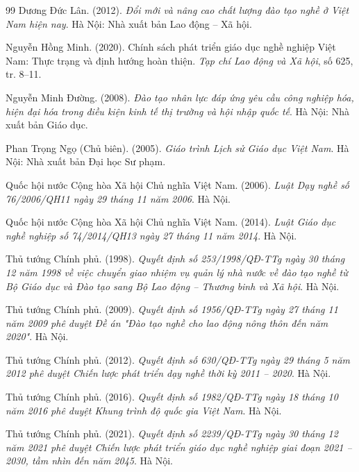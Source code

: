 \begin{thebibliography}{99}
Dương Đức Lân. (2012). \textit{Đổi mới và nâng cao chất lượng đào tạo nghề ở Việt Nam hiện nay}. Hà Nội: Nhà xuất bản Lao động -- Xã hội.

Nguyễn Hồng Minh. (2020). Chính sách phát triển giáo dục nghề nghiệp Việt Nam: Thực trạng và định hướng hoàn thiện. \textit{Tạp chí Lao động và Xã hội}, số 625, tr. 8--11.

Nguyễn Minh Đường. (2008). \textit{Đào tạo nhân lực đáp ứng yêu cầu công nghiệp hóa, hiện đại hóa trong điều kiện kinh tế thị trường và hội nhập quốc tế}. Hà Nội: Nhà xuất bản Giáo dục.

Phan Trọng Ngọ (Chủ biên). (2005). \textit{Giáo trình Lịch sử Giáo dục Việt Nam}. Hà Nội: Nhà xuất bản Đại học Sư phạm.

Quốc hội nước Cộng hòa Xã hội Chủ nghĩa Việt Nam. (2006). \textit{Luật Dạy nghề số 76/2006/QH11 ngày 29 tháng 11 năm 2006}. Hà Nội.

Quốc hội nước Cộng hòa Xã hội Chủ nghĩa Việt Nam. (2014). \textit{Luật Giáo dục nghề nghiệp số 74/2014/QH13 ngày 27 tháng 11 năm 2014}. Hà Nội.

Thủ tướng Chính phủ. (1998). \textit{Quyết định số 253/1998/QĐ-TTg ngày 30 tháng 12 năm 1998 về việc chuyển giao nhiệm vụ quản lý nhà nước về đào tạo nghề từ Bộ Giáo dục và Đào tạo sang Bộ Lao động -- Thương binh và Xã hội}. Hà Nội.

Thủ tướng Chính phủ. (2009). \textit{Quyết định số 1956/QĐ-TTg ngày 27 tháng 11 năm 2009 phê duyệt Đề án "Đào tạo nghề cho lao động nông thôn đến năm 2020"}. Hà Nội.

Thủ tướng Chính phủ. (2012). \textit{Quyết định số 630/QĐ-TTg ngày 29 tháng 5 năm 2012 phê duyệt Chiến lược phát triển dạy nghề thời kỳ 2011 -- 2020}. Hà Nội.

Thủ tướng Chính phủ. (2016). \textit{Quyết định số 1982/QĐ-TTg ngày 18 tháng 10 năm 2016 phê duyệt Khung trình độ quốc gia Việt Nam}. Hà Nội.

Thủ tướng Chính phủ. (2021). \textit{Quyết định số 2239/QĐ-TTg ngày 30 tháng 12 năm 2021 phê duyệt Chiến lược phát triển giáo dục nghề nghiệp giai đoạn 2021 -- 2030, tầm nhìn đến năm 2045}. Hà Nội.


\end{thebibliography}
